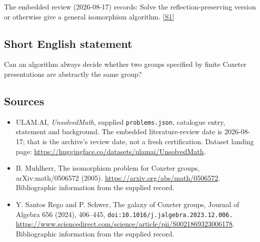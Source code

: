 \documentclass[11pt,a4paper]{article}
\newcommand{\sref}[2]{\hyperlink{source:#1:#2}{[S#2]}}
\begin{document}
The embedded review (2026-08-17) records: Solve the reflection-preserving version or otherwise give a general isomorphism algorithm. \sref{statement}{1}

\subsection{Short English statement}

Can an algorithm always decide whether two groups specified by finite Coxeter presentations are abstractly the same group?

\subsection{Sources}

{\small

\begin{itemize}

\item[\hypertarget{source:statement:1}{S1}] ULAM.AI, \emph{UnsolvedMath}, supplied \texttt{problems.json}, catalogue entry, statement and background. The embedded literature-review date is 2026-08-17; that is the archive’s review date, not a fresh certification. Dataset landing page: \url{https://huggingface.co/datasets/ulamai/UnsolvedMath}.

\item[\hypertarget{source:statement:2}{S2}] B. Muhlherr, The isomorphism problem for Coxeter groups, arXiv:math/0506572 (2005). \url{https://arxiv.org/abs/math/0506572}. Bibliographic information from the supplied record.

\item[\hypertarget{source:statement:3}{S3}] Y. Santos Rego and P. Schwer, The galaxy of Coxeter groups, Journal of Algebra 656 (2024), 406--445, \nolinkurl{doi:10.1016/j.jalgebra.2023.12.006.} \url{https://www.sciencedirect.com/science/article/pii/S0021869323006178}. Bibliographic information from the supplied record.

\end{itemize}

}

\label{end:statement}
\end{document}
